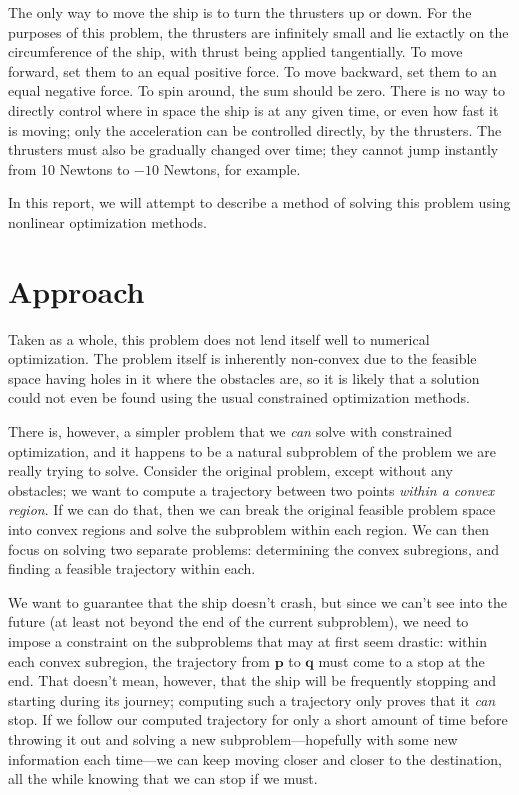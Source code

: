 \documentclass{report}
\begin{document}
The only way to move the ship is to turn the thrusters up or down. 
For the purposes of this problem, the thrusters are infinitely small
and lie extactly on the circumference of the ship, with thrust being
applied tangentially.
To
move forward, set them to an equal positive force. To move backward,
set them to an equal negative force. To spin around,
the sum should be zero. There is no
way to directly control where in space the ship is at any given time,
or even how fast it is moving; only the acceleration can be controlled
directly, by the thrusters. The thrusters must also be gradually changed
over time; they cannot jump instantly from 10 Newtons to $-10$ Newtons,
for example.
\vspace{0.5em}

In this report, we will attempt to describe a method of solving this
problem using nonlinear optimization methods.

\section{Approach}
Taken as a whole, this problem does not lend itself well to numerical
optimization. The problem itself is inherently non-convex due to the
feasible space having holes in it where the obstacles are, so it is likely
that a solution could not even be found using the usual constrained
optimization methods.

There is, however, a simpler problem that we \emph{can} solve with
constrained optimization, and it happens to be a natural subproblem of
the problem we are really trying to solve. Consider the original
problem, except without any obstacles; we want to compute a trajectory
between two points \emph{within a convex region}. If we can do that,
then we can break the original feasible problem space into convex
regions and solve the subproblem within each region. We can then focus
on solving two separate problems: determining the convex subregions, and 
finding a feasible trajectory within each.

We want to guarantee that the ship doesn't crash, but since we can't see
into the future (at least not beyond the end of the current subproblem),
we need to impose a constraint on the subproblems that
may at first seem drastic:
within each convex subregion, the trajectory from $\mathbf{p}$ to
$\mathbf{q}$ must come to a stop at the end. That doesn't mean, however, that the
ship will be frequently stopping and starting during its journey;
computing such a trajectory only proves that it \emph{can} stop. If we
follow our computed trajectory for only a short amount of time before
throwing it out and solving a new subproblem---hopefully with some new
information each time---we can keep moving closer and closer to the
destination, all the while knowing that we can stop if we must.
\end{document}

